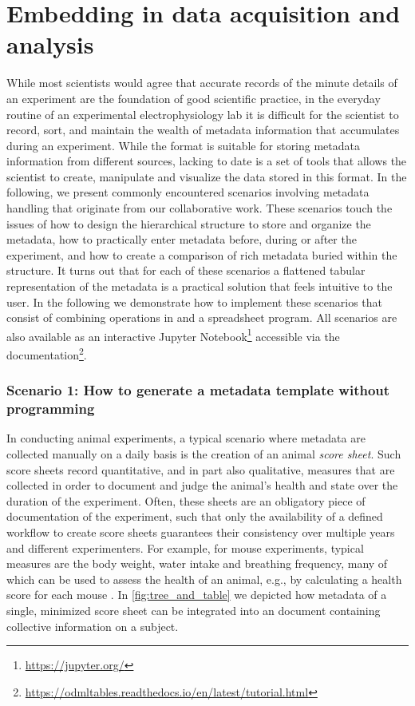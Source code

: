 \section{Embedding  in data acquisition and analysis}
\label{sec:Illustrative-Examples}

While most scientists would agree that accurate records of the minute details of an experiment are the foundation of good scientific practice, in the everyday routine of an experimental electrophysiology lab it is difficult for the scientist to record, sort, and maintain the wealth of metadata information that accumulates during an experiment. While the  format is suitable for storing metadata information from different sources, lacking to date is a set of tools that allows the scientist to create, manipulate and visualize the data stored in this format. In the following, we present commonly encountered scenarios involving metadata handling that originate from our collaborative work. These scenarios touch the issues of how to design the hierarchical structure to store and organize the metadata, how to practically enter metadata before, during or after the experiment, and how to create a comparison of rich metadata buried within the  structure. It turns out that for each of these scenarios a flattened tabular representation of the metadata is a practical solution that feels intuitive to the user. In the following we demonstrate how to implement these scenarios that consist of combining operations in  and a spreadsheet program. All scenarios are also available as an interactive Jupyter Notebook\footnote{\url{https://jupyter.org/}} accessible via the  documentation\footnote{\url{https://odmltables.readthedocs.io/en/latest/tutorial.html}}.

\subsubsection*{Scenario 1: How to generate a metadata template without programming}
\label{sec:Template-Generation}
In conducting animal experiments, a typical scenario where metadata are collected manually on a daily basis is the creation of an animal \textit{score sheet}. Such score sheets record quantitative, and in part also qualitative, measures that are collected in order to document and judge the animal's health and state over the duration of the experiment. Often, these sheets are an obligatory piece of documentation of the experiment, such that only the availability of a defined workflow to create score sheets guarantees their consistency over multiple years and different experimenters. For example, for mouse experiments, typical measures are the body weight, water intake and breathing frequency, many of which can be used to assess the health of an animal, e.g., by calculating a health score for each mouse \citep{Foltz_1999, Burkholder_2012}. In \cref{fig:tree_and_table} we depicted how metadata of a single, minimized score sheet can be integrated into an  document containing collective information on a subject.

